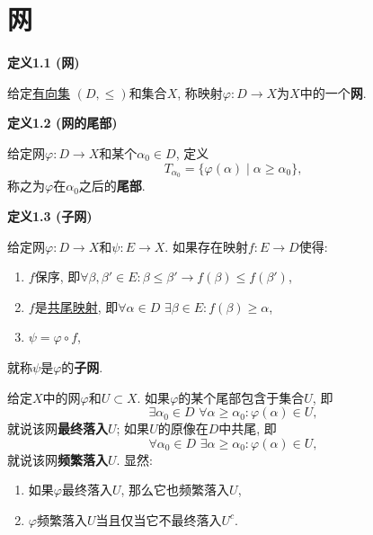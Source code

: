 


\setlength{\abovedisplayskip}{1pt}
\setlength{\belowdisplayskip}{1pt}

\section{网}

\hypertarget{sec:定义1.1}{}
\noindent\textbf{定义1.1 (网)}

给定\href{../../01 基础集合论/04 序理论/01 序关系/01 预序关系#nameddest=sec:定义2.1}{有向集}
$(D,\leqslant)$和集合$X$, 称映射$\varphi:D\to X$为$X$中的一个\textbf{网}.

\vspace{10pt}

\hypertarget{sec:定义1.2}{}
\noindent\textbf{定义1.2 (网的尾部)}

给定网$\varphi:D\to X$和某个$\alpha_0\in D$, 定义
\[
    T_{\alpha_0}=\{\varphi(\alpha)\mid\alpha\geqslant\alpha_0\},
\]
称之为$\varphi$在$\alpha_0$之后的\textbf{尾部}.

\vspace{10pt}

\hypertarget{sec:定义1.3}{}
\noindent\textbf{定义1.3 (子网)}

给定网$\varphi:D\to X$和$\psi:E\to X$. 如果存在映射$f:E\to D$使得:
\begin{enumerate}
    \item $f$保序, 即$\forall\beta,\beta'\in E:\beta\leqslant\beta'\to
    f(\beta)\leqslant f(\beta')$,
    \item $f$是\href{../../01 基础集合论/04 序理论/01 序关系/01 预序关系#nameddest=sec:定义3.2}
    {共尾映射}, 即$\forall\alpha\in D\,\,\exists\beta\in E:f(\beta)\geqslant\alpha$,
    \item $\psi=\varphi\circ f$,
\end{enumerate}
就称$\psi$是$\varphi$的\textbf{子网}.

\vspace{10pt}

给定$X$中的网$\varphi$和$U\subset X$. 如果$\varphi$的某个尾部包含于集合$U$, 即
\[
    \exists\alpha_0\in D\,\,\forall\alpha\geqslant\alpha_0:\varphi(\alpha)\in U,
\]
就说该网\textbf{最终落入}$U$; 如果$U$的原像在$D$中共尾, 即
\[
    \forall\alpha_0\in D\,\,\exists\alpha\geqslant\alpha_0:\varphi(\alpha)\in U,
\]
就说该网\textbf{频繁落入}$U$. 显然:
\begin{enumerate}
    \item 如果$\varphi$最终落入$U$, 那么它也频繁落入$U$,
    \item $\varphi$频繁落入$U$当且仅当它不最终落入$U^c$.
\end{enumerate}

